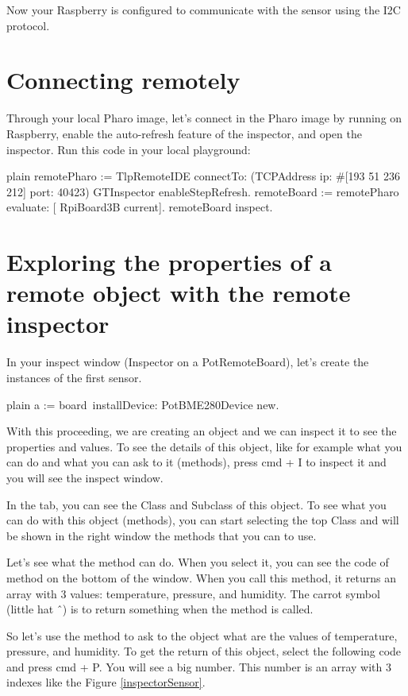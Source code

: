 \documentclass[10pt,twoside,english]{_support/latex/sbabook/sbabook}
\begin{document}
Now your Raspberry is configured to communicate with the sensor using the I2C protocol. 
\section{Connecting remotely}
Through your local Pharo image, let’s connect in the Pharo image by running on Raspberry, enable the auto-refresh feature of the inspector, and open the inspector.
Run this code in your local playground:

\begin{displaycode}{plain}
remotePharo := TlpRemoteIDE connectTo: (TCPAddress ip: #[193 51 236 212] port: 40423)
GTInspector enableStepRefresh.
remoteBoard := remotePharo evaluate: [ RpiBoard3B current].
remoteBoard inspect.
\end{displaycode}
\section{Exploring the properties of a remote object with the remote inspector}
In your inspect window (Inspector on a PotRemoteBoard), let’s create the instances of the first sensor. 

\begin{displaycode}{plain}
a := board installDevice: PotBME280Device new. ​
\end{displaycode}

With this proceeding, we are creating an object and we can inspect it to see the properties and values. To see the details of this object, like for example what you can do and what you can ask to it (methods), press cmd + I to inspect it and you will see the inspect window. 

In the  tab, you can see the Class and Subclass of this object. To see what you can do with this object (methods), you can start selecting the top Class and will be shown in the right window the methods that you can to use.

Let's see what the method  can do. When you select it, you can see the code of method on the bottom of the window. When you call this method, it returns an array with 3 values: temperature, pressure, and humidity. The carrot symbol (little hat ˆ) is to return something when the method is called. 

So let's use the method  to ask to the object what are the values of temperature, pressure, and humidity. To get the return of this object, select the following code and press cmd + P. You will see a big number. This number is an array with 3 indexes like the Figure \ref{inspectorSensor}. 
\end{document}
